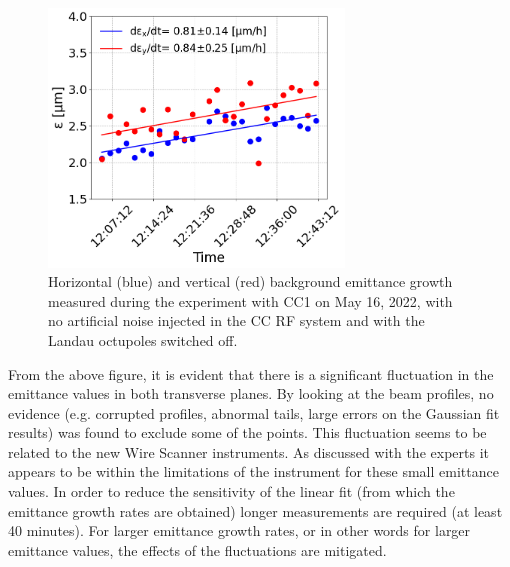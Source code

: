 \begin{figure}[!h] %
   \centering         
   \includegraphics[width=0.7\textwidth]{images/Ch8/cc_md_2022_background_in_scan.png}
       \caption{Horizontal (blue) and vertical (red) background emittance growth measured during the experiment with CC1 on May 16, 2022, with no artificial noise injected in the CC RF system and with the Landau octupoles switched off.}
       \label{fig:cc_md_2022_background_growth_in_scan}
\end{figure}


From the above figure, it is evident that there is a significant fluctuation in the emittance values in both transverse planes. By looking at the beam profiles, no evidence (e.g. corrupted profiles, abnormal tails, large errors on the Gaussian fit results) was found to exclude some of the points. This fluctuation seems to be related to the new Wire Scanner instruments. As discussed with the experts it appears to be within the limitations of the instrument for these small emittance values. In order to reduce the sensitivity of the linear fit (from which the emittance growth rates are obtained) longer measurements are required (at least 40 minutes). For larger emittance growth rates, or in other words for larger emittance values, the effects of the fluctuations are mitigated.



